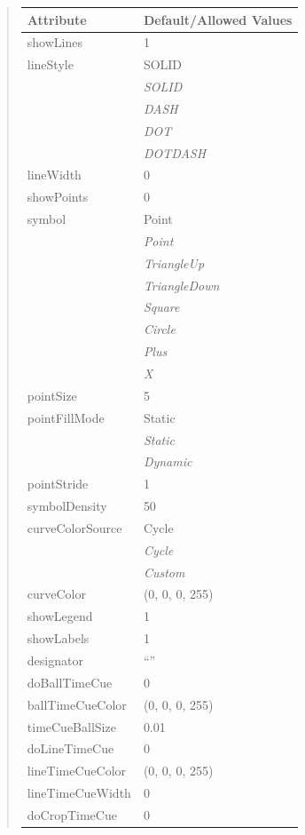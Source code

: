 \documentclass[letterpaper,10pt,english]{sphinxmanual}
\begin{document}
\begin{quote}
\begin{longtable}{|l|l|}
\textbf{Attribute}
 & 
\textbf{Default/Allowed Values}
\\
\hline
showLines
 & 
1
\\
\hline
lineStyle
 & 
SOLID
\\
\hline & 
\emph{SOLID}
\\
\hline & 
\emph{DASH}
\\
\hline & 
\emph{DOT}
\\
\hline & 
\emph{DOTDASH}
\\
\hline
lineWidth
 & 
0
\\
\hline
showPoints
 & 
0
\\
\hline
symbol
 & 
Point
\\
\hline & 
\emph{Point}
\\
\hline & 
\emph{TriangleUp}
\\
\hline & 
\emph{TriangleDown}
\\
\hline & 
\emph{Square}
\\
\hline & 
\emph{Circle}
\\
\hline & 
\emph{Plus}
\\
\hline & 
\emph{X}
\\
\hline
pointSize
 & 
5
\\
\hline
pointFillMode
 & 
Static
\\
\hline & 
\emph{Static}
\\
\hline & 
\emph{Dynamic}
\\
\hline
pointStride
 & 
1
\\
\hline
symbolDensity
 & 
50
\\
\hline
curveColorSource
 & 
Cycle
\\
\hline & 
\emph{Cycle}
\\
\hline & 
\emph{Custom}
\\
\hline
curveColor
 & 
(0, 0, 0, 255)
\\
\hline
showLegend
 & 
1
\\
\hline
showLabels
 & 
1
\\
\hline
designator
 & 
``''
\\
\hline
doBallTimeCue
 & 
0
\\
\hline
ballTimeCueColor
 & 
(0, 0, 0, 255)
\\
\hline
timeCueBallSize
 & 
0.01
\\
\hline
doLineTimeCue
 & 
0
\\
\hline
lineTimeCueColor
 & 
(0, 0, 0, 255)
\\
\hline
lineTimeCueWidth
 & 
0
\\
\hline
doCropTimeCue
 & 
0
\\

\end{longtable}
\end{quote}
\end{document}
